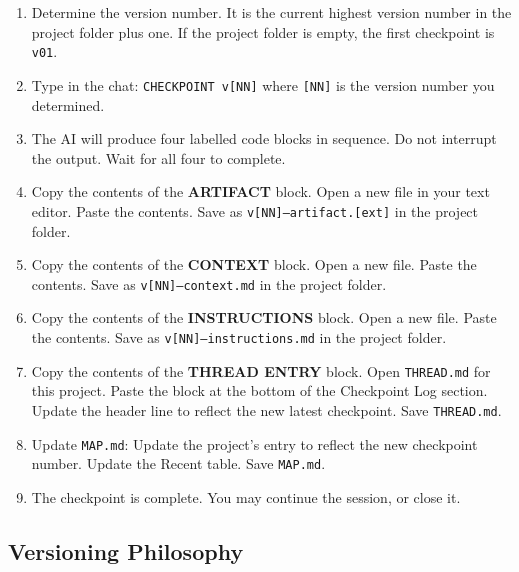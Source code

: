 \documentclass[12pt,letterpaper]{article}
\begin{document}
\begin{enumerate}
  \item Determine the version number. It is the current highest version
        number in the project folder plus one. If the project folder is
        empty, the first checkpoint is \texttt{v01}.

  \item Type in the chat: \texttt{CHECKPOINT v[NN]}
        where \texttt{[NN]} is the version number you determined.

  \item The AI will produce four labelled code blocks in sequence.
        Do not interrupt the output. Wait for all four to complete.

  \item Copy the contents of the \textbf{ARTIFACT} block.
        Open a new file in your text editor.
        Paste the contents.
        Save as \texttt{v[NN]--artifact.[ext]} in the project folder.

  \item Copy the contents of the \textbf{CONTEXT} block.
        Open a new file.
        Paste the contents.
        Save as \texttt{v[NN]--context.md} in the project folder.

  \item Copy the contents of the \textbf{INSTRUCTIONS} block.
        Open a new file.
        Paste the contents.
        Save as \texttt{v[NN]--instructions.md} in the project folder.

  \item Copy the contents of the \textbf{THREAD ENTRY} block.
        Open \texttt{THREAD.md} for this project.
        Paste the block at the bottom of the Checkpoint Log section.
        Update the header line to reflect the new latest checkpoint.
        Save \texttt{THREAD.md}.

  \item Update \texttt{MAP.md}:
        Update the project's entry to reflect the new checkpoint number.
        Update the Recent table.
        Save \texttt{MAP.md}.

  \item The checkpoint is complete.
        You may continue the session, or close it.
\end{enumerate}

\subsection{Versioning Philosophy}
\end{document}
